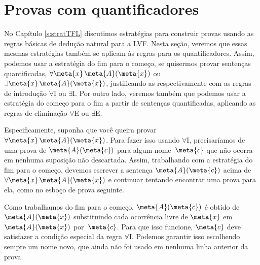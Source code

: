 
\chapter{Provas com quantificadores}

No Capítulo \ref{s:stratTFL}  discutimos estratégias para construir provas usando as regras básicas de dedução natural para a LVF.  Nesta seção, veremos que essas mesmas estratégias também se aplicam às regras para os quantificadores. Assim, podemos usar a estratégia do fim para o começo, se quisermos provar sentenças quantificadas,  $\forall \meta{x}\, \atom{\meta{A}}{\meta{x}}$ ou $\exists \meta{x}\, \atom{\meta{A}}{\meta{x}}$, justificando-as respectivamente com as regras de introdução $\forall$I ou $\exists$I. Por outro lado, veremos também que podemos usar a estratégia do começo para o fim a partir de sentenças quantificadas, aplicando as regras de eliminação $\forall$E ou $\exists$E.

Especificamente, suponha que você queira provar $\forall \meta{x}\, \atom{\meta{A}}{\meta{x}}$. Para fazer isso usando $\forall$I, precisaríamos de uma prova de $\atom{\meta{A}}{\meta{c}}$ para algum nome~$\meta{c}$ que não ocorra em nenhuma suposição não descartada. Assim, trabalhando com a estratégia do fim para o começo, devemos escrever  a sentença $\atom{\meta{A}}{\meta{c}}$ acima de $\forall \meta{x}\, \atom{\meta{A}}{\meta{x}}$ e continuar tentando encontrar uma prova para ela, como no esboço de prova seguinte. 
 
\begin{fitchproof}
	\ellipsesline
\end{fitchproof}
 
Como trabalhamos do fim para o começo,  $\atom{\meta{A}}{\meta{c}}$ é obtido de $\atom{\meta{A}}{\meta{x}}$ substituindo cada ocorrência livre de $\meta{x}$ em $\atom{\meta{A}}{\meta{x}}$ por~$\meta{c}$. Para que isso funcione, $\meta{c}$ deve satisfazer a condição especial da regra $\forall$I. Podemos garantir isso escolhendo sempre um nome novo, que ainda não foi usado em nenhuma linha anterior da prova.

